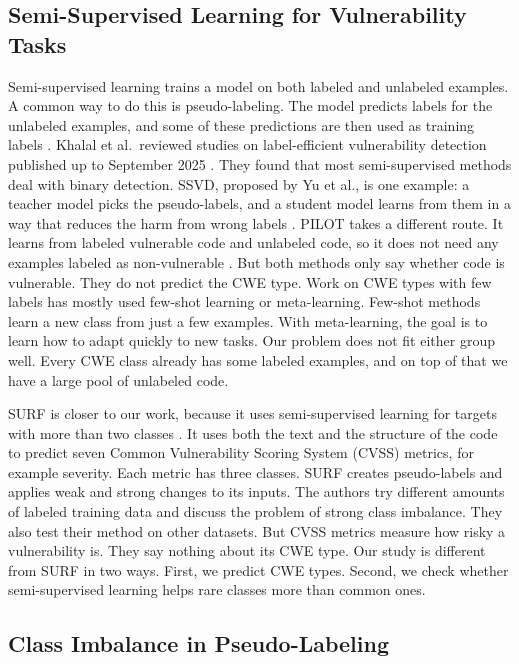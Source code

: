 \documentclass[conference]{IEEEtran}
\begin{document}
\subsection{Semi-Supervised Learning for Vulnerability
Tasks}\label{semi-supervised-learning-for-vulnerability-tasks}

Semi-supervised learning trains a model on both labeled and unlabeled
examples. A common way to do this is pseudo-labeling. The model predicts
labels for the unlabeled examples, and some of these predictions are
then used as training labels \cite{lee2013pseudo}. Khalal et
al.~reviewed studies on label-efficient vulnerability detection
published up to September 2025 \cite{khalal2026labels}. They found that
most semi-supervised methods deal with binary detection. SSVD, proposed
by Yu et al., is one example: a teacher model picks the pseudo-labels,
and a student model learns from them in a way that reduces the harm from
wrong labels \cite{yu2025less}. PILOT takes a different route. It learns
from labeled vulnerable code and unlabeled code, so it does not need any
examples labeled as non-vulnerable \cite{wen2023pilot}. But both methods
only say whether code is vulnerable. They do not predict the CWE type.
Work on CWE types with few labels has mostly used few-shot learning or
meta-learning. Few-shot methods learn a new class from just a few
examples. With meta-learning, the goal is to learn how to adapt quickly
to new tasks. Our problem does not fit either group well. Every CWE
class already has some labeled examples, and on top of that we have a
large pool of unlabeled code.

SURF is closer to our work, because it uses semi-supervised learning for
targets with more than two classes \cite{pei2025surf}. It uses both the
text and the structure of the code to predict seven Common Vulnerability
Scoring System (CVSS) metrics, for example severity. Each metric has
three classes. SURF creates pseudo-labels and applies weak and strong
changes to its inputs. The authors try different amounts of labeled
training data and discuss the problem of strong class imbalance. They
also test their method on other datasets. But CVSS metrics measure how
risky a vulnerability is. They say nothing about its CWE type. Our study
is different from SURF in two ways. First, we predict CWE types. Second,
we check whether semi-supervised learning helps rare classes more than
common ones.

\subsection{Class Imbalance in
Pseudo-Labeling}\label{class-imbalance-in-pseudo-labeling}
\end{document}

